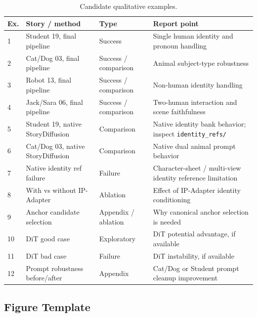 \documentclass[11pt,a4paper]{article}
\begin{document}
\begin{table}[H]
\centering
\small
\begin{tabularx}{\textwidth}{p{} p{} p{} X}
\toprule
\textbf{Ex.} & \textbf{Story / method} & \textbf{Type} & \textbf{Report point} \\
\midrule
1 & Student 19, final pipeline & Success & Single human identity and pronoun handling \\
2 & Cat/Dog 03, final pipeline & Success / comparison & Animal subject-type robustness \\
3 & Robot 13, final pipeline & Success / comparison & Non-human identity handling \\
4 & Jack/Sara 06, final pipeline & Success / comparison & Two-human interaction and scene faithfulness \\
5 & Student 19, native StoryDiffusion & Comparison & Native identity bank behavior; inspect \texttt{identity\_refs/} \\
6 & Cat/Dog 03, native StoryDiffusion & Comparison & Native dual animal prompt behavior \\
7 & Native identity ref failure & Failure & Character-sheet / multi-view identity reference limitation \\
8 & With vs without IP-Adapter & Ablation & Effect of IP-Adapter identity conditioning \\
9 & Anchor candidate selection & Appendix / ablation & Why canonical anchor selection is needed \\
10 & DiT good case & Exploratory & DiT potential advantage, if available \\
11 & DiT bad case & Failure & DiT instability, if available \\
12 & Prompt robustness before/after & Appendix & Cat/Dog or Student prompt cleanup improvement \\
\bottomrule
\end{tabularx}
\caption{Candidate qualitative examples.}
\label{tab:qual_examples}
\end{table}

\subsection{Figure Template}
\end{document}
